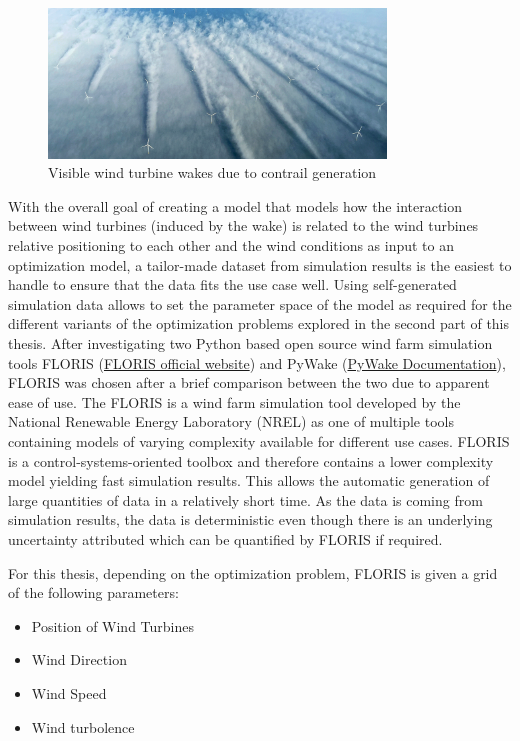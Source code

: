 \begin{figure}[h] 
	\centering
	\includegraphics[width=0.8\textwidth]{figures/introduction/wake_photo.png} 
	\caption{Visible wind turbine wakes due to contrail generation \cite{windpowermonthly_offshore_clusters}}
	\label{fig:wake_photo}
\end{figure}


With the overall goal of creating a model that models how the interaction between wind turbines (induced by the wake) is related to the wind turbines relative positioning to each other and the wind conditions as input to an optimization model, a tailor-made dataset from simulation results is the easiest to handle to ensure that the data fits the use case well. Using self-generated simulation data allows to set the parameter space of the model as required for the different variants of the optimization problems explored in the second part of this thesis. After investigating two Python based open source wind farm simulation tools FLORIS (\href{https://www.nrel.gov/wind/floris}{FLORIS official website}) and PyWake (\href{https://topfarm.pages.windenergy.dtu.dk/PyWake/}{PyWake Documentation}), FLORIS was chosen after a brief comparison between the two due to apparent ease of use. The FLORIS is a wind farm simulation tool developed by the National Renewable Energy Laboratory (NREL) as one of multiple tools containing models of varying complexity available for different use cases. FLORIS is a control-systems-oriented toolbox and therefore contains a lower complexity model yielding fast simulation results. This allows the automatic generation of large quantities of data in a relatively short time. As the data is coming from  simulation results, the data is deterministic even though there is an underlying uncertainty attributed which can be quantified by FLORIS if required. 

For this thesis, depending on the optimization problem, FLORIS is given a grid of the following parameters:

\begin{itemize}
	\item Position of Wind Turbines
	\item Wind Direction
	\item Wind Speed
	\item Wind turbolence
\end{itemize}

